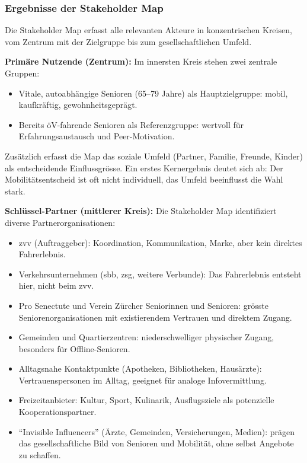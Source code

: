 \subsubsection{Ergebnisse der Stakeholder Map}

Die Stakeholder Map erfasst alle relevanten Akteure in konzentrischen Kreisen, vom Zentrum mit der Zielgruppe bis zum gesellschaftlichen Umfeld.

\textbf{Primäre Nutzende (Zentrum):}
Im innersten Kreis stehen zwei zentrale Gruppen:

\begin{itemize}
  \item Vitale, autoabhängige Senioren (65--79 Jahre) als Hauptzielgruppe: mobil, kaufkräftig, gewohnheitsgeprägt.
  \item Bereits öV-fahrende Senioren als Referenzgruppe: wertvoll für Erfahrungsaustausch und Peer-Motivation.
\end{itemize}

Zusätzlich erfasst die Map das soziale Umfeld (Partner, Familie, Freunde, Kinder) als entscheidende Einflussgrösse.
Ein erstes Kernergebnis deutet sich ab: Der Mobilitätsentscheid ist oft nicht individuell, das Umfeld beeinflusst die Wahl stark.

\textbf{Schlüssel-Partner (mittlerer Kreis):}
Die Stakeholder Map identifiziert diverse Partnerorganisationen:


\begin{itemize}
  \item \gls{zvv} (Auftraggeber): Koordination, Kommunikation, Marke, aber kein direktes Fahrerlebnis.
  \item Verkehrsunternehmen (\gls{sbb}, \gls{zsg}, weitere Verbunde): Das Fahrerlebnis entsteht hier, nicht beim \gls{zvv}.
  \item Pro Senectute und Verein Zürcher Seniorinnen und Senioren: grösste Seniorenorganisationen mit existierendem Vertrauen und direktem Zugang.
  \item Gemeinden und Quartierzentren: niederschwelliger physischer Zugang, besonders für Offline-Senioren.
  \item Alltagsnahe Kontaktpunkte (Apotheken, Bibliotheken, Hausärzte): Vertrauenspersonen im Alltag, geeignet für analoge Infovermittlung.
  \item Freizeitanbieter: Kultur, Sport, Kulinarik, Ausflugsziele als potenzielle Kooperationspartner.
  \item ``Invisible Influencers'' (Ärzte, Gemeinden, Versicherungen, Medien): prägen das gesellschaftliche Bild von Senioren und Mobilität, ohne selbst Angebote zu schaffen.
\end{itemize}

